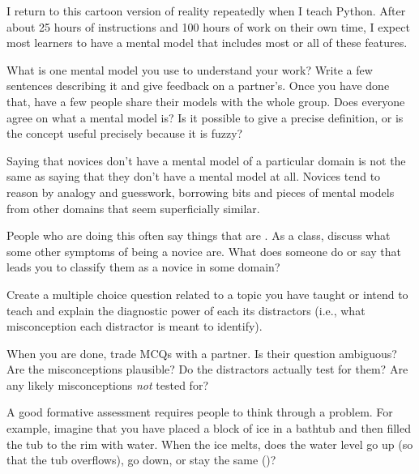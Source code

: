 I return to this cartoon version of reality repeatedly when I teach Python.
After about 25 hours of instructions and 100 hours of work on their own time,
I expect most learners to have a mental model
that includes most or all of these features.



What is one mental model you use to understand your work?
Write a few sentences describing it and give feedback on a partner's.
Once you have done that,
have a few people share their models with the whole group.
Does everyone agree on what a mental model is?
Is it possible to give a precise definition,
or is the concept useful precisely because it is fuzzy?


Saying that novices don't have a mental model of a particular domain
is not the same as saying that they don't have a mental model at all.
Novices tend to reason by analogy and guesswork,
borrowing bits and pieces of mental models from other domains that seem superficially similar.

People who are doing this often say things that are
.
As a class,
discuss what some other symptoms of being a novice are.
What does someone do or say that leads you to classify them as a novice in some domain?


Create a multiple choice question related to a topic you have taught
or intend to teach
and explain the diagnostic power of each its distractors
(i.e., what misconception each distractor is meant to identify).

When you are done, trade MCQs with a partner.
Is their question ambiguous?
Are the misconceptions plausible?
Do the distractors actually test for them?
Are any likely misconceptions \emph{not} tested for?


A good formative assessment requires people to think through a problem.
For example,
imagine that you have placed a block of ice in a bathtub and then filled the tub to the rim with water.
When the ice melts,
does the water level go up (so that the tub overflows),
go down,
or stay the same ()?

